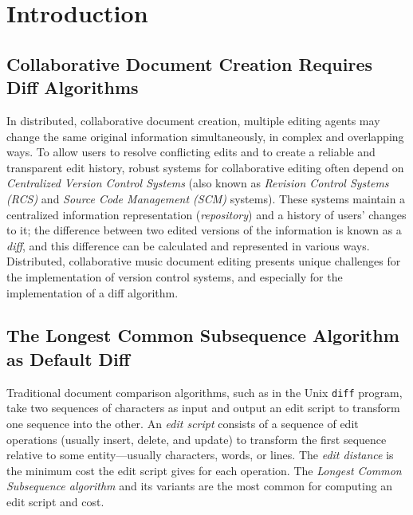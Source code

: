\documentclass{article}
\title{\papertitle}
\begin{document}
%
\capstartfalse
\maketitle
\capstarttrue
%
\begin{abstract}
We describe an application of hierarchic diff to the collaborative
editing of tree-based music representations, using Zhang and Shasha's
tree edit distance algorithm as implemented within the XUDiff tool.
The edit distance between two trees is the minimum number of edit
operations necessary to transform one tree into the other.  We
consider common operations on the score tree---deleting, changing, and
appending tree nodes---to derive a minimal edit sequence, known as an
edit script, and we compare the performance of the widely used Longest
Common Subsequence algorithm against our approach. We conclude by summarizing implications for the design of collaborative music document software systems.
\end{abstract}

\section{Introduction}\label{sec:introduction}
\subsection{Collaborative Document Creation Requires Diff Algorithms}
In distributed, collaborative document creation, multiple editing agents may change the same original information simultaneously, in complex and overlapping ways. To allow users to resolve conflicting edits and to create a reliable and transparent edit history, robust systems for collaborative editing often depend on \emph{Centralized Version Control Systems} (also known as \emph{Revision Control Systems (RCS)} and \emph{Source Code Management (SCM)} systems). These systems maintain a centralized information representation (\emph{repository}) and a history of users' changes to it; the difference between two edited versions of the information is known as a \emph{diff}, and this difference can be calculated and represented in various ways. Distributed, collaborative music document editing presents unique challenges for the implementation of version control systems, and especially for the implementation of a diff algorithm.

\subsection{The Longest Common Subsequence Algorithm as Default Diff}
Traditional document comparison algorithms, such as in the Unix
\texttt{diff} program, take two sequences of characters as input and
output an edit script to transform one sequence into the other.  An
\emph{edit script} consists of a sequence of edit operations (usually
insert, delete, and update) to transform the first sequence relative
to some entity---usually characters, words, or lines.  The \emph{edit
  distance} is the minimum cost the edit script gives for each
operation.  The \emph{Longest Common Subsequence algorithm} and its variants
are the most common for computing an edit script and cost.
\end{document}
